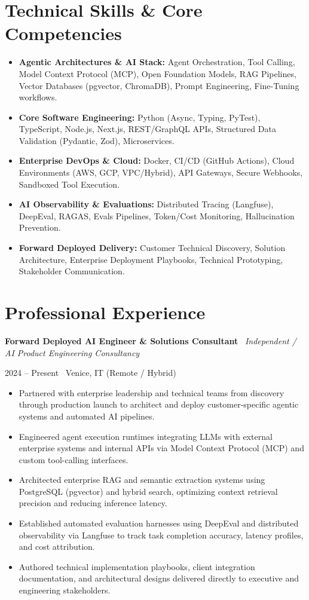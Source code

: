 \documentclass[a4paper,10pt]{article}
\newcommand{\role}[4]{%
  \vspace{2pt}\noindent
  \begin{minipage}[t]{0.70\textwidth}\raggedright\textbf{#1} \textbullet\ \textit{#3}\end{minipage}%
  \hfill
  \begin{minipage}[t]{0.28\textwidth}\raggedleft\footnotesize\color{gray}#2 \textbullet\ #4\end{minipage}%
  \vspace{1pt}%
}
\begin{document}
\section{Technical Skills \& Core Competencies}
\begin{itemize}[leftmargin=1.2em, itemsep=2pt]
  \item \textbf{Agentic Architectures \& AI Stack:} Agent Orchestration, Tool Calling, Model Context Protocol (MCP), Open Foundation Models, RAG Pipelines, Vector Databases (pgvector, ChromaDB), Prompt Engineering, Fine-Tuning workflows.
  \item \textbf{Core Software Engineering:} Python (Async, Typing, PyTest), TypeScript, Node.js, Next.js, REST/GraphQL APIs, Structured Data Validation (Pydantic, Zod), Microservices.
  \item \textbf{Enterprise DevOps \& Cloud:} Docker, CI/CD (GitHub Actions), Cloud Environments (AWS, GCP, VPC/Hybrid), API Gateways, Secure Webhooks, Sandboxed Tool Execution.
  \item \textbf{AI Observability \& Evaluations:} Distributed Tracing (Langfuse), DeepEval, RAGAS, Evals Pipelines, Token/Cost Monitoring, Hallucination Prevention.
  \item \textbf{Forward Deployed Delivery:} Customer Technical Discovery, Solution Architecture, Enterprise Deployment Playbooks, Technical Prototyping, Stakeholder Communication.
\end{itemize}

\section{Professional Experience}

\role{Forward Deployed AI Engineer \& Solutions Consultant}{2024 -- Present}{Independent / AI Product Engineering Consultancy}{Venice, IT (Remote / Hybrid)}
\begin{itemize}
  \item Partnered with enterprise leadership and technical teams from discovery through production launch to architect and deploy customer-specific agentic systems and automated AI pipelines.
  \item Engineered agent execution runtimes integrating LLMs with external enterprise systems and internal APIs via Model Context Protocol (MCP) and custom tool-calling interfaces.
  \item Architected enterprise RAG and semantic extraction systems using PostgreSQL (pgvector) and hybrid search, optimizing context retrieval precision and reducing inference latency.
  \item Established automated evaluation harnesses using DeepEval and distributed observability via Langfuse to track task completion accuracy, latency profiles, and cost attribution.
  \item Authored technical implementation playbooks, client integration documentation, and architectural designs delivered directly to executive and engineering stakeholders.
\end{itemize}
\end{document}
